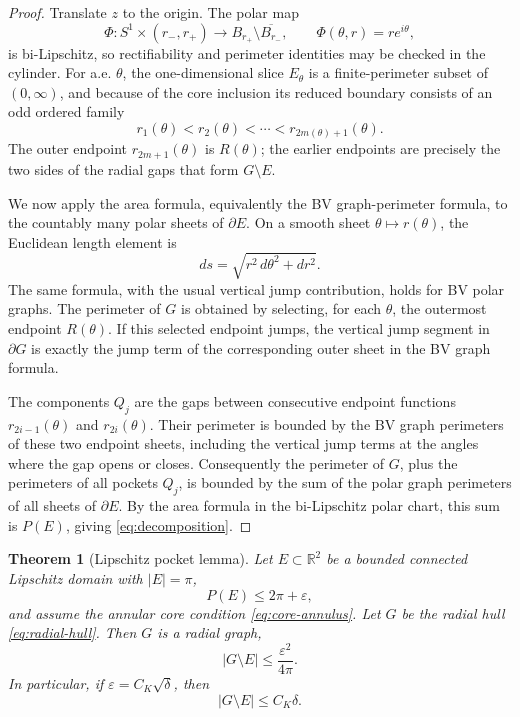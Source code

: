 \documentclass[11pt]{article}
\newtheorem{theorem}{Theorem}[section]
\newcommand{\R}{\mathbb R}
\begin{document}
\begin{proof}
Translate \(z\) to the origin.  The polar map
\[
   \Phi:S^1\times(r_-,r_+)\to B_{r_+}\setminus \overline{B_{r_-}},
   \qquad
   \Phi(\theta,r)=re^{i\theta},
\]
is bi-Lipschitz, so rectifiability and perimeter identities may be checked in
the cylinder.  For a.e. \(\theta\), the one-dimensional slice \(E_\theta\) is
a finite-perimeter subset of \((0,\infty)\), and because of the core inclusion
its reduced boundary consists of an odd ordered family
\[
   r_1(\theta)<r_2(\theta)<\cdots<r_{2m(\theta)+1}(\theta).
\]
The outer endpoint \(r_{2m+1}(\theta)\) is \(R(\theta)\); the earlier
endpoints are precisely the two sides of the radial gaps that form
\(G\setminus E\).

We now apply the area formula, equivalently the BV graph-perimeter formula, to
the countably many polar sheets of \(\partial E\).  On a smooth sheet
\(\theta\mapsto r(\theta)\), the Euclidean length element is
\[
   ds=\sqrt{r^2\,d\theta^2+dr^2}.
\]
The same formula, with the usual vertical jump contribution, holds for BV
polar graphs.  The perimeter of \(G\) is obtained by selecting, for each
\(\theta\), the outermost endpoint \(R(\theta)\).  If this selected endpoint
jumps, the vertical jump segment in \(\partial G\) is exactly the jump term of
the corresponding outer sheet in the BV graph formula.

The components \(Q_j\) are the gaps between consecutive endpoint functions
\(r_{2i-1}(\theta)\) and \(r_{2i}(\theta)\).  Their perimeter is bounded by
the BV graph perimeters of these two endpoint sheets, including the vertical
jump terms at the angles where the gap opens or closes.  Consequently the
perimeter of \(G\), plus the perimeters of all pockets \(Q_j\), is bounded by
the sum of the polar graph perimeters of all sheets of \(\partial E\).  By the
area formula in the bi-Lipschitz polar chart, this sum is \(P(E)\), giving
\eqref{eq:decomposition}.
\end{proof}

\begin{theorem}[Lipschitz pocket lemma]\label{thm:pocket}
Let \(E\subset\R^2\) be a bounded connected Lipschitz domain with \(|E|=\pi\),
\[
   P(E)\le2\pi+\varepsilon,
\]
and assume the annular core condition \eqref{eq:core-annulus}.  Let \(G\) be
the radial hull \eqref{eq:radial-hull}.  Then \(G\) is a radial graph,
\[
   |G\setminus E|\le \frac{\varepsilon^2}{4\pi}.
   \tag{5.4}\label{eq:pocket-area}
\]
In particular, if \(\varepsilon=C_K\sqrt\delta\), then
\[
   |G\setminus E|\le C_K\delta .
   \tag{5.5}
\]
\end{theorem}
\end{document}
